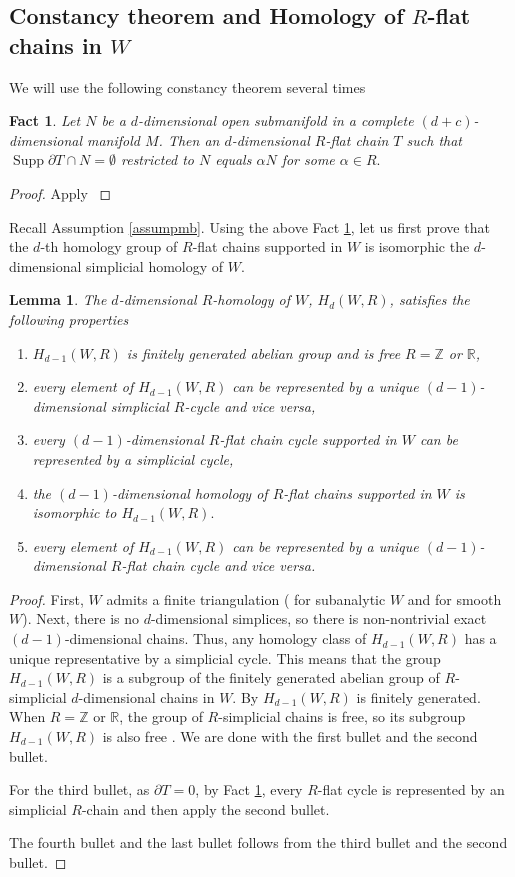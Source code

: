\documentclass[11pt,a4paper]{amsart}
\numberwithin{equation}{section}
\newcommand{\supp}{\operatorname{Supp}}
\newcommand{\ai}{\alpha}
\newcommand{\es}{\emptyset}
\newcommand{\pd}{\partial}
\newcommand{\R}{\mathbb{R}}
\newcommand{\Z}{\mathbb{Z}}
\theoremstyle{plain}
\newtheorem{lem}{Lemma}[subsection]
\newtheorem{fact}{Fact}[subsection]
\theoremstyle{definition}
\numberwithin{equation}{subsection}
\begin{document}
			\subsection{Constancy theorem and Homology of $R$-flat chains in $W$}
	We will use the following constancy theorem several times
	\begin{fact}\label{fctct}
		Let $N$ be a $d$-dimensional open submanifold in a complete $(d+c)$-dimensional manifold $M$. Then an $d$-dimensional $R$-flat chain $T$ such that $\supp \pd T\cap N=\es$ restricted to $N$ equals $\ai N$ for some $\ai\in R.$
	\end{fact}
	\begin{proof}
		Apply \cite[6.1 Theorem]{MSfc}
	\end{proof}
	Recall Assumption \ref{assumpmb}. Using the above Fact \ref{fctct}, let us first prove that the $d$-th homology group of $R$-flat chains supported in $W$ is isomorphic the $d$-dimensional simplicial homology of $W$.
	\begin{lem}\label{fcthomr}
		The $d$-dimensional $R$-homology of $W$, $H_d(W,R)$, satisfies the following properties
		\begin{enumerate}
			\item $H_{d-1}(W,R)$ is finitely generated abelian group and is free $R=\Z$ or $\R$,
			\item every element of $H_{d-1}(W,R)$ can be represented by a unique $(d-1)$-dimensional simplicial $R$-cycle and vice versa,
			\item every $(d-1)$-dimensional $R$-flat chain cycle supported in $W$ can be represented by a simplicial cycle, 
			\item the $(d-1)$-dimensional homology of $R$-flat chains supported in $W$ is isomorphic to $H_{d-1}(W,R).$ 
			\item every element of $H_{d-1}(W,R)$ can be represented by a unique $(d-1)$-dimensional $R$-flat chain cycle and vice versa.
		\end{enumerate}
		\end{lem}
		\begin{proof}
			First, $W$ admits a finite triangulation (\cite[7.4 Theorem]{BPhs} for subanalytic $W$ and \cite{SCtr} for smooth $W$). Next, there is no $d$-dimensional simplices, so there is non-nontrivial exact $(d-1)$-dimensional chains. Thus, any homology class of $H_{d-1}(W,R)$ has a unique representative by a simplicial cycle. This means that the group $H_{d-1}(W,R)$ is a subgroup of the finitely generated abelian group of $R$-simplicial $d$-dimensional chains in $W$. By \cite[Proposition 4.52]{AKba} $H_{d-1}(W,R)$ is finitely generated. When $R=\Z$ or $\R$, the group of $R$-simplicial chains is free, so its subgroup $H_{d-1}(W,R)$ is also free \cite[Theorem 4.55]{AKba}. We are done with the first bullet and the second bullet.
			
			For the third bullet, as $\pd T=0$, by Fact \ref{fctct}, every $R$-flat cycle is represented by an simplicial $R$-chain and then apply the second bullet. 
			
			The fourth bullet and the last bullet follows from the third bullet and the second bullet.	
		\end{proof}
\end{document}
